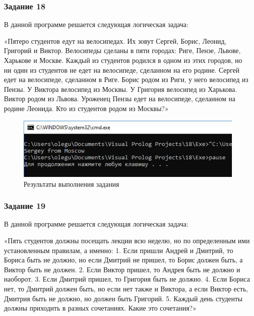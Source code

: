 \documentclass[14pt,a4paper,report]{report}
\begin{document}
\subsubsection{Задание 18}

В данной программе решается следующая логическая задача:

«Пятеро студентов едут на велосипедах. Их зовут Сергей, Борис, Леонид, Григорий и Виктор. Велосипеды сделаны в пяти городах: Риге, Пензе, Львове, Харькове и Москве. Каждый из студентов родился в одном из этих городов, но ни один из студентов не едет на велосипеде, сделанном на его родине. Сергей едет на велосипеде, сделанном в Риге. Борис родом из Риги, у него велосипед из Пензы. У Виктора велосипед из Москвы. У Григория велосипед из Харькова. Виктор родом из Львова. Уроженец Пензы едет на велосипеде, сделанном на родине Леонида. Кто из студентов родом из Москвы?»



\begin{figure}[h!]
	\centering
	\includegraphics[scale = 0.9]{images/d18.png}
	\caption{Результаты выполнения задания}
\end{figure}
\clearpage
\subsubsection{Задание 19}

В данной программе решается следующая логическая задача:

«Пять студентов должны посещать лекции всю неделю, но по определенным ими установленным правилам, а именно:
1. Если пришли Андрей и Дмитрий, то Бориса быть не должно, но если Дмитрий не пришел, то Борис должен быть, а Виктор быть не должен.
2. Если Виктор пришел, то Андрея быть не должно и наоборот.
3. Если Дмитрий пришел, то Григория быть не должно.
4. Если Бориса нет, то Дмитрий должен быть, но если нет также и Виктора, а если Виктор есть, Дмитрия быть не должно, но должен быть Григорий.
5. Каждый день студенты должны приходить в разных сочетаниях.
Какие это сочетания?»


\end{document}
